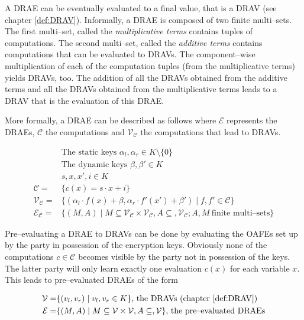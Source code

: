 \noindent{}A DRAE can be eventually evaluated to a final value, that is a DRAV
(see chapter \ref{def:DRAV}). Informally, a DRAE is composed of two finite
multi--sets. The first multi--set, called the \emph{multiplicative terms}
contains tuples of computations. The second multi--set, called the
\emph{additive terms} contains computations that can be evaluated to DRAVs. The
component--wise multiplication of each of the computation tuples (from the
multiplicative terms) yields DRAVs, too. The addition of all the DRAVs obtained
from the additive terms and all the DRAVs obtained from the multiplicative terms
leads to a DRAV that is the evaluation of this DRAE.

More formally, a DRAE can be described as follows where $\mathcal{E}$ represents
the DRAEs, $\mathcal{C}$ the computations and $\mathcal{V}_\mathcal{C}$ the
computations that lead to DRAVs.

\begin{align}
%
  &\text{The static keys } \alpha_l, \alpha_r \in K \setminus \{0\} \nonumber\\
%
  &\text{The dynamic keys } \beta, \beta' \in K \nonumber\\
%
  &s, x, x', i \in K \nonumber\\
%
  \mathcal{C} = & \{ c(x) = s \cdot x + i \} \nonumber\\
%
  \mathcal{V}_\mathcal{C} = & \{ (\alpha_l \cdot f(x) + \beta,
                      \alpha_r \cdot f'(x') + \beta' )
                    \mid f, f' \in \mathcal{C} \} \nonumber\\
%
  \label{rel:DRAE}
  \mathcal{E}_\mathcal{C} = & \{ (M, A) \mid
      M \subseteq \mathcal{V}_\mathcal{C} \times
      \mathcal{V}_\mathcal{C}, A \subseteq, \mathcal{V}_\mathcal{C};
  A, M~\text{finite multi--sets} \}
%
\end{align}

Pre--evaluating a DRAE to DRAVs can be done by evaluating the OAFEs set up by
the party in possession of the encryption keys. Obviously none of the
computations $c \in \mathcal{C}$ becomes visible by the party not in possession
of the keys. The latter party will only learn exactly one evaluation $c(x)$ for
each variable $x$. This leads to pre--evaluated DRAEs of the form

\begin{align}
  \mathcal{V} = & \{ (v_l, v_r) \mid v_l, v_r \in K \}
  \text{, the DRAVs (chapter \ref{def:DRAV})} \nonumber\\
%
  \label{rel:pre-eval-DRAE}
  \mathcal{E} = & \{ (M, A) \mid
      M \subseteq \mathcal{V} \times \mathcal{V}, A \subseteq, \mathcal{V} \}
      \text{, the pre--evaluated DRAEs}
\end{align}

